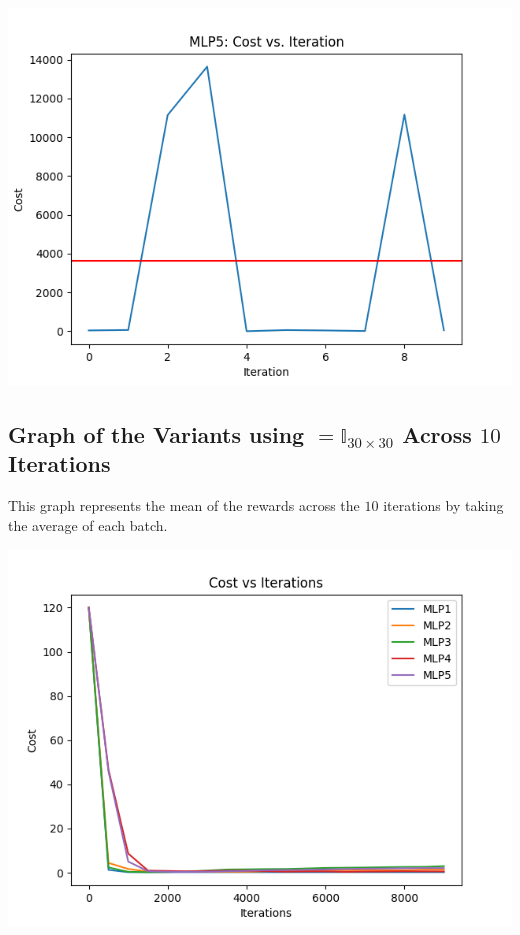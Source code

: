 \documentclass{article}
\begin{document}
\begin{center}
    \includegraphics[scale=0.5]{RR/MLP5.png}
\end{center}



\subsection*{Graph of the Variants using $=\mathbb{I}_{30\times 30}$ Across $10$ Iterations}
This graph represents the mean of the rewards across the $10$ iterations by taking the average of each batch.
\begin{center}
    \includegraphics[scale=0.5]{RI/MLPcosts.png}
\end{center}
\end{document}
